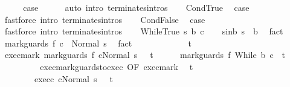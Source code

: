 \begin{isabellebody}
\isanewline
\ \ \isamarkupfalse%
\ \isamarkupfalse%
\ {\isacharquery}case\isanewline
\ \ \ \ \isamarkupfalse%
\ {\isacharparenleft}auto\ intro{\isacharcolon}\ terminates{\isachardot}intros{\isacharparenright}\isanewline
{}\isamarkupfalse%
\isanewline
\ \ \isamarkupfalse%
\ CondTrue\ \isamarkupfalse%
\ {\isacharquery}case\ \isamarkupfalse%
\ {\isacharparenleft}fastforce\ intro{\isacharcolon}\ terminates{\isachardot}intros{\isacharparenright}\isanewline
{}\isamarkupfalse%
\isanewline
\ \ \isamarkupfalse%
\ CondFalse\ \isamarkupfalse%
\ {\isacharquery}case\ \isamarkupfalse%
\ {\isacharparenleft}fastforce\ intro{\isacharcolon}\ terminates{\isachardot}intros{\isacharparenright}\isanewline
{}\isamarkupfalse%
\isanewline
\ \ \isamarkupfalse%
\ {\isacharparenleft}WhileTrue\ s\ b\ c{\isacharparenright}\isanewline
\ \ \isamarkupfalse%
\ s{\isacharunderscore}in{\isacharunderscore}b{\isacharcolon}\ {\isachardoublequoteopen}s\ {\isasymin}\ b{\isachardoublequoteclose}\ \isamarkupfalse%
\ fact\isanewline
\ \ \isamarkupfalse%
\ {\isachardoublequoteopen}{\isasymGamma}{\isasymturnstile}mark{\isacharunderscore}guards\ f\ c\ {\isasymdown}\ Normal\ s{\isachardoublequoteclose}\ \isamarkupfalse%
\ fact\isanewline
\ \ \isamarkupfalse%
\ \isanewline
\ \ \isacommand{{\isacharbraceleft}}\isamarkupfalse%
\isanewline
\ \ \ \ \isamarkupfalse%
\ t\isanewline
\ \ \ \ \isamarkupfalse%
\ exec{\isacharunderscore}mark{\isacharcolon}\ {\isachardoublequoteopen}{\isasymGamma}{\isasymturnstile}{\isasymlangle}mark{\isacharunderscore}guards\ f\ c{\isacharcomma}Normal\ s\ {\isasymrangle}\ {\isasymRightarrow}\ t{\isachardoublequoteclose}\isanewline
\ \ \ \ \isamarkupfalse%
\ {\isachardoublequoteopen}{\isasymGamma}{\isasymturnstile}mark{\isacharunderscore}guards\ f\ {\isacharparenleft}While\ b\ c{\isacharparenright}\ {\isasymdown}\ t{\isachardoublequoteclose}\isanewline
\ \ \ \ \isamarkupfalse%
\ {\isacharminus}\isanewline
\ \ \ \ \ \ \isamarkupfalse%
\ exec{\isacharunderscore}mark{\isacharunderscore}guards{\isacharunderscore}to{\isacharunderscore}exec\ {\isacharbrackleft}OF\ exec{\isacharunderscore}mark{\isacharbrackright}\ \isamarkupfalse%
\ t{\isacharprime}\ \isanewline
\ \ \ \ \ \ \ \ exec{\isacharunderscore}c{}{\isacharcolon}\ {\isachardoublequoteopen}{\isasymGamma}{\isasymturnstile}{\isasymlangle}c{\isacharcomma}Normal\ s\ {\isasymrangle}\ {\isasymRightarrow}\ t{\isacharprime}{\isachardoublequoteclose}\ \isanewline

\end{isabellebody}
